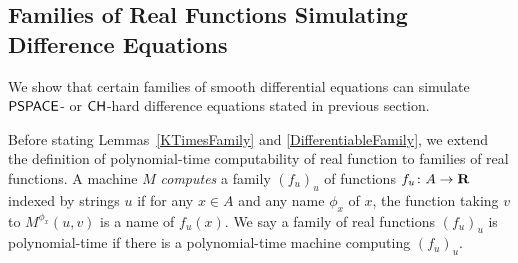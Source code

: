 



\subsection{Families of Real Functions Simulating Difference Equations}
\label{subsection: ode family}
We show that certain families of smooth differential equations can simulate 
$\mathsf{PSPACE}$- or $\mathsf{CH}$-hard difference equations stated in previous section.

Before stating Lemmas~\ref{KTimesFamily} and \ref{DifferentiableFamily},
we extend the definition of polynomial-time computability of real function
to families of real functions.
A machine $M$ \emph{computes} a family $(f_u)_u$ of functions $f _u \colon A \to \mathbf R$ 
indexed by strings $u$
if for any $x \in A$ and any name $\phi_x$ of $x$,
the function taking $v$ to $M ^{\phi _x} (u, v)$ is a name of $f _u (x)$.
We say a family of real functions $(f_u)_u$ is polynomial-time if there is
a polynomial-time machine computing $(f_u)_u$.


